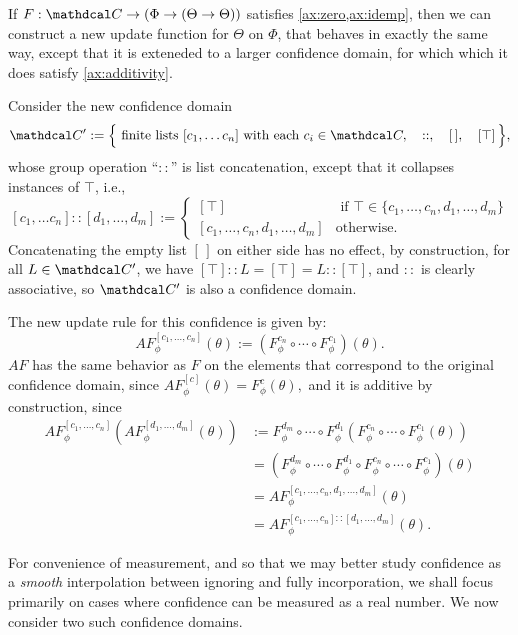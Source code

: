 \begin{prop} \label{prop:free-additivity}
	If $F: \confdom \to (\Phi \to (\Theta \to \Theta))$ satisfies \cref{ax:zero,ax:idemp}, then we can construct a new update
	function for $\Theta$ on $\Phi$, that behaves in exactly the same way, except that it is exteneded to a larger confidence domain, for which which it does satisfy \cref{ax:additivity}.
\end{prop}
\begin{lproof}
Consider the new confidence domain
$$
	\confdom' := \Big\{ \text{ finite lists } [c_1, \ldots c_n]
		\text{ with each } c_i \in \confdom,
		\quad
		::,
		\quad
		[\,],
		\quad
		[\top]
		\,
	\Big\},
$$
whose group operation ``$::$'' is list concatenation, except that it collapses instances of $\top$, i.e.,
\[
	[c_1, \ldots c_n] :: [d_1, \ldots, d_m]
	 := \begin{cases}
		 [\top] & \text{ if } \top \in \{c_1, \ldots, c_n,d_1, \ldots,d_m \} \\
		 [c_1, \ldots, c_{n}, d_1, \ldots, d_m] & \text{otherwise.}
 \end{cases}
\]
Concatenating the empty list $[\,]$ on either side has no effect,
by construction, for all $L \in \confdom'$, we have $[\top] :: L = [\top] = L :: [\top]$,
and $::$ is clearly associative, so $\confdom'$ is also a confidence domain.

The new update rule for this confidence is given by:
	\[
		AF^{[c_1, \ldots, c_n]}_\phi (\theta)  :=
				(F^{c_n}_\phi \circ \cdots \circ F^{c_1}_\phi) (\theta).
	\]
$AF$ has the same behavior as $F$ on the elements that correspond to the original confidence domain, since
$
	AF^{[c]}_\phi(\theta) = F^c_\phi(\theta),
$
and it is additive by construction, since
\begin{align*}
AF^{[c_1, \ldots, c_n]}_\phi ( AF^{[d_1, \ldots, d_m]}_\phi (\theta) )
		&:=
			F^{d_m}_\phi \circ \cdots \circ F^{d_1}_\phi (
			F^{c_n}_\phi \circ \cdots \circ F^{c_1}_\phi (\theta))\\
		&= (F^{d_m}_\phi \circ \cdots \circ F^{d_1}_\phi \circ
		F^{c_n}_\phi \circ \cdots \circ F^{c_1}_\phi) (\theta) \\
		&= AF^{[c_1, \ldots, c_n, d_1, \ldots, d_m]}_\phi (\theta) \\
		&= AF^{[c_1, \ldots, c_n] :: [d_1, \ldots, d_m]}_\phi (\theta).
\end{align*}
\end{lproof}%
For convenience of measurement, and so that we may better study confidence as a \emph{smooth} interpolation between ignoring and fully incorporation, we shall focus primarily on cases where confidence can be measured as a real number.
We now consider two such confidence domains.

